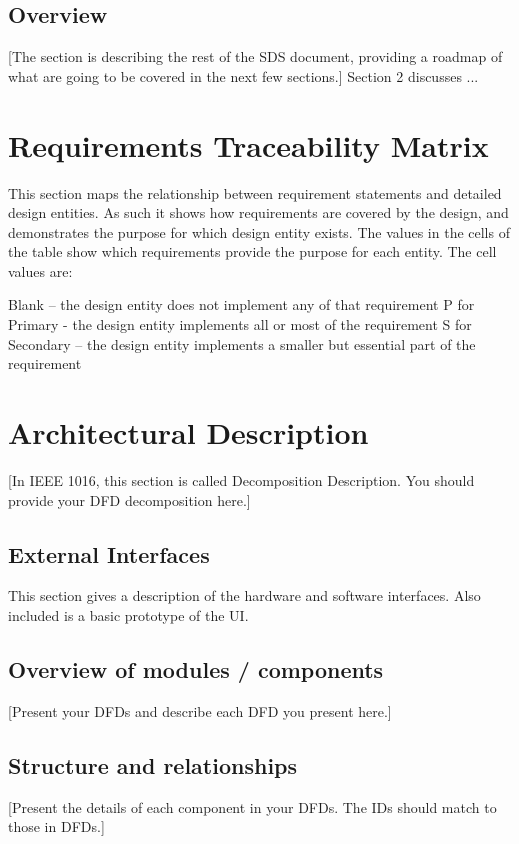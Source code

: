 \documentclass{article}
\begin{document}
\subsection{Overview}


[The section is describing the rest of the SDS document, providing a roadmap of what are going to be covered in the next few sections.]
Section 2 discusses ...

\newpage

\section{Requirements Traceability Matrix}
This section maps the relationship between requirement statements and detailed design entities.  As such it shows how requirements are covered by the design, and demonstrates the purpose for which design entity exists.
The values in the cells of the table show which requirements provide the purpose for each entity. The cell values are:

Blank – the design entity does not implement any of that requirement
P for Primary - the design entity implements all or most of the requirement
S for Secondary – the design entity implements a smaller but essential part of the requirement

\section{Architectural Description}
[In IEEE 1016, this section is called Decomposition Description.  You should provide your DFD decomposition here.] 

\subsection{External Interfaces}

This section gives a description of the hardware and software interfaces. Also included is a basic prototype of the UI.

\subsection{Overview of modules / components}

[Present your DFDs and describe each DFD you present here.]

\subsection{Structure and relationships}
[Present the details of each component in your DFDs.  The IDs should match to those in DFDs.]
\end{document}
